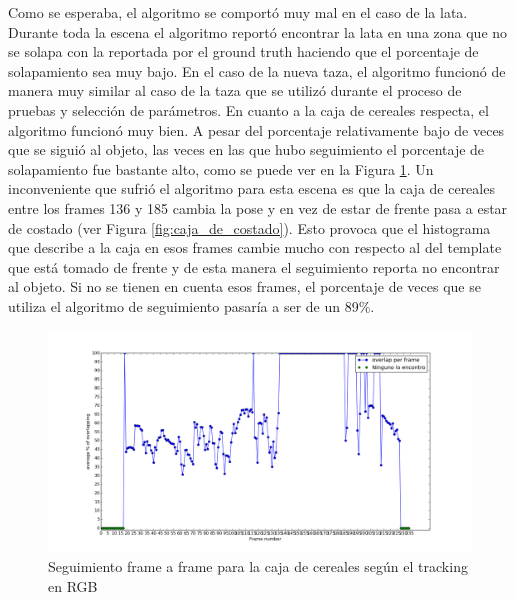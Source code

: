 Como se esperaba, el algoritmo se comportó muy mal en el caso de la lata. Durante toda la escena el algoritmo reportó encontrar la lata en una zona que no se solapa con la reportada por el ground truth haciendo que el porcentaje de solapamiento sea muy bajo. En el caso de la nueva taza, el algoritmo funcionó de manera muy similar al caso de la taza que se utilizó durante el proceso de pruebas y selección de parámetros. En cuanto a la caja de cereales respecta, el algoritmo funcionó muy bien. A pesar del porcentaje relativamente bajo de veces que se siguió al objeto, las veces en las que hubo seguimiento el porcentaje de solapamiento fue bastante alto, como se puede ver en la Figura \ref{frame_frame_rgb_nuevo}. Un inconveniente que sufrió el algoritmo para esta escena es que la caja de cereales entre los frames 136 y 185 cambia la pose y en vez de estar de frente pasa a estar de costado (ver Figura \ref{fig:caja_de_costado}). Esto provoca que el histograma que describe a la caja en esos frames cambie mucho con respecto al del template que está tomado de frente y de esta manera el seguimiento reporta no encontrar al objeto. Si no se tienen en cuenta esos frames, el porcentaje de veces que se utiliza el algoritmo de seguimiento pasaría a ser de un 89\%.

\begin{figure}[t]
	\centering
	\includegraphics[width=\textwidth]{img/frame_a_frame/rgb-caja.png}
	\caption{Seguimiento frame a frame para la caja de cereales según el tracking en RGB}
	\label{frame_frame_rgb_nuevo}
\end{figure}


